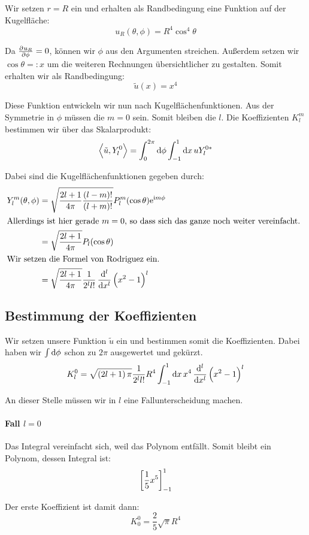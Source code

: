 Wir setzen $r = R$ ein und erhalten als Randbedingung eine Funktion auf der
Kugelfläche:
\[
	u_R(\theta, \phi) = R^4 \cos^4 \theta
\]

Da $\pd{u_R}\phi = 0$, können wir $\phi$ aus den Argumenten streichen. Außerdem
setzen wir $\cos \theta =: x$ um die weiteren Rechnungen übersichtlicher zu
gestalten. Somit erhalten wir als Randbedingung:
\[
	\tilde u(x) = x^4
\]

Diese Funktion entwickeln wir nun nach Kugelflächenfunktionen. Aus der
Symmetrie in $\phi$ müssen die $m = 0$ sein. Somit bleiben die $l$. Die
Koeffizienten $K_l^m$ bestimmen wir über das Skalarprodukt:
\[
\inner{\tilde u}{Y_l^0} = \int_0^{2\pi} \dif \phi \int_{-1}^1 \dif x \, u Y_l^{0*}
\]

Dabei sind die Kugelflächenfunktionen gegeben durch:
\begin{align*}
Y_l^m(\theta, \phi) &= \sqrt{\frac{2l+1}{4\pi} \frac{(l-m)!}{(l+m)!}} P_l^m(\cos \theta) \ee^{\ii m \phi} \\
	\intertext{%
	Allerdings ist hier gerade $m = 0$, so dass sich das ganze noch weiter
	vereinfacht.
	}
									   &= \sqrt{\frac{2l+1}{4\pi}} P_l(\cos \theta) \\
	\intertext{%
	Wir setzen die Formel von Rodriguez ein.
	}
									   &= \sqrt{\frac{2l+1}{4\pi}} \frac{1}{2^l l!} \dod[l]{}x \del{x^2-1}^l
\end{align*}

\subsection{Bestimmung der Koeffizienten}

Wir setzen unsere Funktion $\tilde u$ ein und bestimmen somit die
Koeffizienten. Dabei haben wir $\int \dif \phi$ schon zu $2 \pi$ ausgewertet
und gekürzt.
\[
K_l^0 = \sqrt{\del{2l+1} \pi} \frac{1}{2^l l!} R^4 \int_{-1}^1 \dif x \, x^4 \dod[l]{}x \del{x^2-1}^l
\]

An dieser Stelle müssen wir in $l$ eine Fallunterscheidung machen.

\paragraph{Fall $l = 0$}

Das Integral vereinfacht sich, weil das Polynom entfällt. Somit bleibt ein
Polynom, dessen Integral ist:
\[
\sbr{\frac 15 x^5}_{-1}^1
\]

Der erste Koeffizient ist damit dann:
\[
K_0^0 = \frac 25 \sqrt{\pi} R^4
\]

